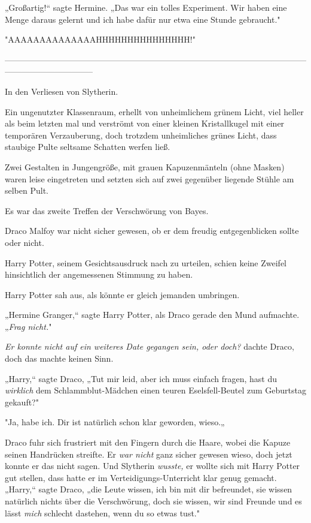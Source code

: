 {„Großartig!“ sagte Hermine. „Das war ein tolles Experiment. Wir haben eine Menge daraus gelernt und ich habe dafür nur etwa eine Stunde gebraucht."

"AAAAAAAAAAAAAAHHHHHHHHHHHHHHH!"

--------------------------------------------------------------------------------------------------------------------------------------------

\hfill\break In den Verliesen von Slytherin.

Ein ungenutzter Klassenraum, erhellt von unheimlichem grünem Licht, viel heller als beim letzten mal und verströmt von einer kleinen Kristallkugel mit einer temporären Verzauberung, doch trotzdem unheimliches grünes Licht, dass staubige Pulte seltsame Schatten werfen ließ.

Zwei Gestalten in Jungengröße, mit grauen Kapuzenmänteln (ohne Masken) waren leise eingetreten und setzten sich auf zwei gegenüber liegende Stühle am selben Pult.

Es war das zweite Treffen der Verschwörung von Bayes.

Draco Malfoy war nicht sicher gewesen, ob er dem freudig entgegenblicken sollte oder nicht.

Harry Potter, seinem Gesichtsausdruck nach zu urteilen, schien keine Zweifel hinsichtlich der angemessenen Stimmung zu haben.

Harry Potter sah aus, als könnte er gleich jemanden umbringen.

„Hermine Granger,“ sagte Harry Potter, als Draco gerade den Mund aufmachte. „\emph{Frag nicht.}"

\emph{Er konnte nicht auf ein weiteres Date gegangen sein, oder doch?} dachte Draco, doch das machte keinen Sinn.

„Harry,“ sagte Draco, „Tut mir leid, aber ich muss einfach fragen, hast du \emph{wirklich} dem Schlammblut-Mädchen einen teuren Eselsfell-Beutel zum Geburtstag gekauft?"

"Ja, habe ich. Dir ist natürlich schon klar geworden, wieso.„

Draco fuhr sich frustriert mit den Fingern durch die Haare, wobei die Kapuze seinen Handrücken streifte. Er \emph{war nicht} ganz sicher gewesen wieso, doch jetzt konnte er das nicht sagen. Und Slytherin \emph{wusste,} er wollte sich mit Harry Potter gut stellen, dass hatte er im Verteidigungs-Unterricht klar genug gemacht. „Harry,“ sagte Draco, „die Leute wissen, ich bin mit dir befreundet, sie wissen natürlich nichts über die Verschwörung, doch sie wissen, wir sind Freunde und es lässt \emph{mich} schlecht dastehen, wenn du so etwas tust."

}
